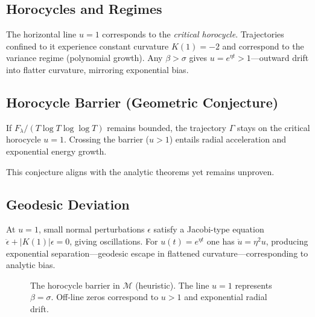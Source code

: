 \subsection{Horocycles and Regimes}

The horizontal line $u=1$ corresponds to the \emph{critical horocycle}.
Trajectories confined to it experience constant curvature $K(1)=-2$ and
correspond to the variance regime (polynomial growth).
Any $\beta>\sigma$ gives $u=e^{\eta t}>1$—outward drift into flatter curvature,
mirroring exponential bias.

\subsection{Horocycle Barrier (Geometric Conjecture)}

\begin{conjecture*}
If $F_\lambda/(T\log T\log\log T)$ remains bounded, the trajectory
$\Gamma$ stays on the critical horocycle $u=1$.
Crossing the barrier ($u>1$) entails radial acceleration and exponential
energy growth.
\end{conjecture*}

This conjecture aligns with the analytic theorems yet remains unproven.

\subsection{Geodesic Deviation}

At $u=1$, small normal perturbations $\epsilon$ satisfy a Jacobi-type equation
$\ddot{\epsilon}+|K(1)|\epsilon=0$, giving oscillations.
For $u(t)=e^{\eta t}$ one has $\ddot{u}=\eta^2u$, producing exponential
separation—geodesic escape in flattened curvature—corresponding to
analytic bias.

\begin{figure}[h]
\centering
{}
\caption{The horocycle barrier in $\mathcal{M}$ (heuristic).
The line $u=1$ represents $\beta=\sigma$.  Off-line zeros correspond to
$u>1$ and exponential radial drift.}
\label{fig:horocycle}
\end{figure}

